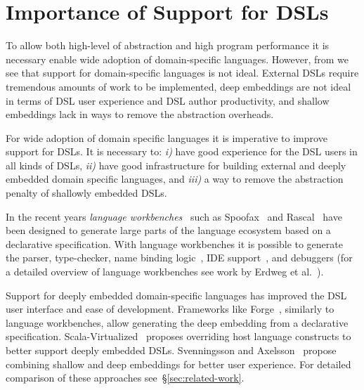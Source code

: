 \section{Importance of Support for DSLs}
\label{sec:importance-of-language-support}

To allow both high-level of abstraction and high program performance it is necessary
 enable wide adoption of domain-specific languages. However, from  we
 see that support for domain-specific languages is not ideal. External DSLs require
 tremendous amounts of work to be implemented, deep embeddings are not ideal in terms
 of DSL user experience and DSL author productivity, and shallow embeddings lack in
 ways to remove the abstraction overheads.

 For wide adoption of domain specific languages it is imperative to improve support
 for DSLs. It is necessary to: \emph{i)} have good experience for the DSL users in all kinds of DSLs,
  \emph{ii)} have good infrastructure for building external and deeply embedded domain specific languages, and \emph{iii)} a way to remove the abstraction penalty of shallowly embedded DSLs.

In the recent years \emph{language workbenches}~\cite{fowler2005language} such as
 Spoofax~\cite{kats2010spoofax} and Rascal~\cite{klint2009rascal,van2011rascal} have been designed
  to generate large parts of the language ecosystem based on a declarative specification.
  With language workbenches it is possible to generate the parser, type-checker, name binding logic~\cite{konat2013declarative},
  IDE support~\cite{lorenzen2013modular}, and debuggers (for a detailed overview of language workbenches see work by Erdweg et al.~\cite{erdweg2013state}).

Support for deeply embedded domain-specific languages has improved the DSL user interface and
ease of development. Frameworks like Forge~\cite{forge}, similarly to language workbenches,
 allow generating the deep embedding from a declarative specification. Scala-Virtualized~\cite{rompf_scala-virtualized:_2009} proposes overriding host language constructs to better support deeply embedded DSLs. Svenningsson and Axelsson~\cite{svenningsson_combining_2012} propose combining shallow and deep embeddings for better user experience. For detailed
 comparison of these approaches see~\S \ref{sec:related-work}.


